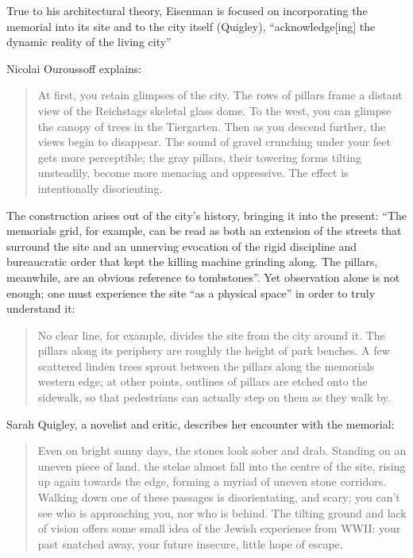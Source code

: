 True to his architectural theory, Eisenman is focused on
incorporating the memorial into its site and to the city itself
(Quigley), “acknowledge[ing] the dynamic reality of the living city” \citep[][pg. 207]{eisenman2004}

Nicolai Ouroussoff explains: 


\begin{quote}
At first, you retain glimpses of the city.  The rows
of pillars frame a distant view of the Reichstag{\textquotesingle}s
skeletal glass dome.  To the west, you can glimpse the canopy of trees
in the Tiergarten.  Then as you descend further, the views begin to
disappear.  The sound of gravel crunching under your feet gets more
perceptible; the gray pillars, their towering forms tilting unsteadily,
become more menacing and oppressive.  The effect is intentionally
disorienting. \citep{ouroussoff2005}
\end{quote}

The construction arises out of the city’s history,
bringing it into the present: “The memorial{\textquotesingle}s grid,
for example, can be read as both an extension of the streets that
surround the site and an unnerving evocation of the rigid discipline
and bureaucratic order that kept the killing machine grinding along. 
The pillars, meanwhile, are an obvious reference to tombstones”\citep{ouroussoff2005}.  
Yet observation alone is not enough; one must
experience the site “as a physical space” in order to truly understand
it: 

\begin{quote}
No clear line, for example, divides the site from the
city around it.  The pillars along its periphery are roughly the height
of park benches.  A few scattered linden trees sprout between the
pillars along the memorial{\textquotesingle}s western edge; at other
points, outlines of pillars are etched onto the sidewalk, so that
pedestrians can actually step on them as they walk by.\citep{ouroussoff2005}
\end{quote}

Sarah Quigley, a novelist and critic, describes her encounter with the
memorial: 

\begin{quote}
Even on bright sunny days, the
stones look sober and drab.  Standing on an uneven piece of land, the
stelae almost fall into the centre of the site, rising up again towards
the edge, forming a myriad of uneven stone corridors.  Walking down one
of these passages is disorientating, and scary; you can’t see who is
approaching you, nor who is behind.  The tilting ground and lack of
vision offers some small idea of the Jewish experience from WWII: your
past snatched away, your future insecure, little hope of escape. \citep{quigley2005}
\end{quote}

